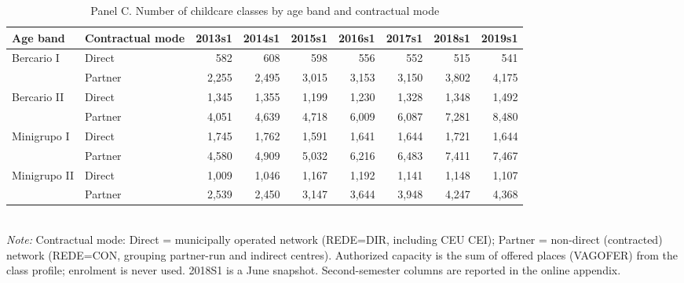 \begin{table}[htbp]\centering
\caption{Panel C. Number of childcare classes by age band and contractual mode}
\label{tab:T2c_nturmas}
\small
\setlength{\tabcolsep}{4pt}
\begin{tabular}{llrrrrrrr}
\toprule
Age band & Contractual mode & 2013s1 & 2014s1 & 2015s1 & 2016s1 & 2017s1 & 2018s1 & 2019s1 \\
\midrule
Bercario I & Direct & 582 & 608 & 598 & 556 & 552 & 515 & 541 \\
 & Partner & 2,255 & 2,495 & 3,015 & 3,153 & 3,150 & 3,802 & 4,175 \\
Bercario II & Direct & 1,345 & 1,355 & 1,199 & 1,230 & 1,328 & 1,348 & 1,492 \\
 & Partner & 4,051 & 4,639 & 4,718 & 6,009 & 6,087 & 7,281 & 8,480 \\
Minigrupo I & Direct & 1,745 & 1,762 & 1,591 & 1,641 & 1,644 & 1,721 & 1,644 \\
 & Partner & 4,580 & 4,909 & 5,032 & 6,216 & 6,483 & 7,411 & 7,467 \\
Minigrupo II & Direct & 1,009 & 1,046 & 1,167 & 1,192 & 1,141 & 1,148 & 1,107 \\
 & Partner & 2,539 & 2,450 & 3,147 & 3,644 & 3,948 & 4,247 & 4,368 \\
\bottomrule
\end{tabular}
\\[3pt]{\footnotesize \textit{Note:} Contractual mode: Direct = municipally operated network (REDE=DIR, including CEU CEI); Partner = non-direct (contracted) network (REDE=CON, grouping partner-run and indirect centres). Authorized capacity is the sum of offered places (VAGOFER) from the class profile; enrolment is never used. 2018S1 is a June snapshot. Second-semester columns are reported in the online appendix.}
\end{table}
